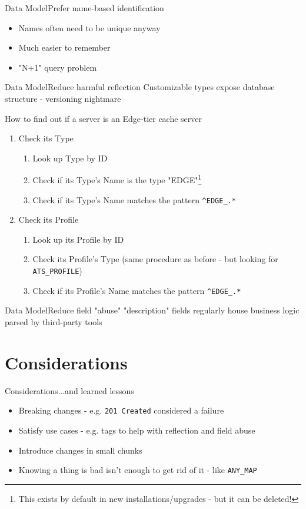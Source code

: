 \documentclass[10pt]{beamer}
\newcommand{\code}[1]{\texorpdfstring{\texttt{\color{inlinecodecolor}#1}}{#1}}
\begin{document}
\begin{frame}{Data Model}{Prefer name-based identification}
\begin{itemize}
	\item Names often need to be unique anyway
	\item Much easier to remember
	\item "N+1" query problem
\end{itemize}
\end{frame}

\begin{frame}{Data Model}{Reduce harmful reflection}
Customizable types expose database structure - versioning nightmare
\begin{block}{How to find out if a server is an Edge-tier cache server}
	\begin{enumerate}
		\item<1-> Check its Type
		\begin{enumerate}
			\item<2-> Look up Type by ID
			\item<3-> Check if its Type's Name is the type "EDGE"\footnote{This exists by default in new installations/upgrades - but it can be deleted!}
			\item<4-> Check if its Type's Name matches the pattern \code{\^{}EDGE\_.*}
		\end{enumerate}
		\item<5-> Check its Profile
		\begin{enumerate}
			\item<6-> Look up its Profile by ID
			\item<7-> Check its Profile's Type (same procedure as before - but looking for \code{ATS\_PROFILE})
			\item<8-> Check if its Profile's Name matches the pattern \code{\^{}EDGE\_.*}
		\end{enumerate}
	\end{enumerate}
\end{block}
\end{frame}

\begin{frame}{Data Model}{Reduce field "abuse"}
"description" fields regularly house business logic parsed by third-party tools
\end{frame}

\section{Considerations}
\begin{frame}{Considerations}{...and learned lessons}
\begin{itemize}
	\item Breaking changes - e.g. \code{201 Created} considered a failure
	\item Satisfy use cases - e.g. tags to help with reflection and field abuse
	\item Introduce changes in small chunks
	\item Knowing a thing is bad isn't enough to get rid of it - like \code{ANY\_MAP}
\end{itemize}
\end{frame}

{\1
\begin{frame}
\end{frame}}
\end{document}
